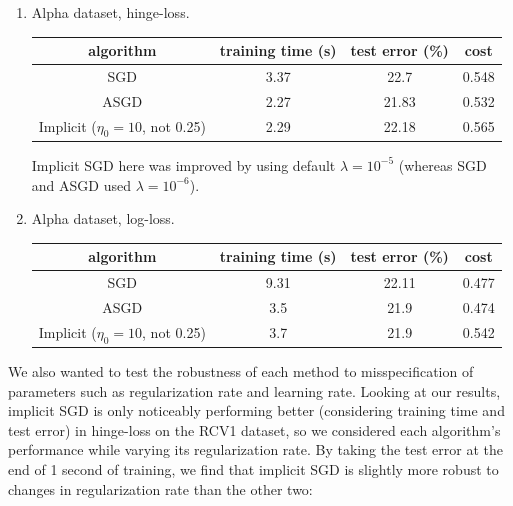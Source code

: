 \documentclass{article}
\begin{document}
\begin{enumerate}[(a)]
\begin{enumerate}[1.]
\item Alpha dataset, hinge-loss.
\begin{center}
\begin{tabular}{ c | c | c | c }
  algorithm & training time (s) & test error (\%) & cost \\ \hline                       
  SGD & 3.37 & 22.7 & 0.548\\
  ASGD & 2.27 & 21.83 & 0.532\\
  Implicit ($\eta_0=10$, not 0.25) & 2.29 & 22.18 & 0.565\\
\end{tabular}
\end{center}
Implicit SGD here was improved by using default $\lambda = 10^{-5}$ (whereas SGD and ASGD used $\lambda = 10^{-6}$).

\item Alpha dataset, log-loss.
\begin{center}
\begin{tabular}{ c | c | c | c }
  algorithm & training time (s) & test error (\%) & cost \\ \hline                       
  SGD & 9.31 &  22.11 & 0.477\\
  ASGD & 3.5 & 21.9 & 0.474\\
  Implicit ($\eta_0=10$, not 0.25) & 3.7 & 21.9 & 0.542\\
\end{tabular}
\end{center}
\end{enumerate}
\end{enumerate}

We also wanted to test the robustness of each method to misspecification of parameters such as regularization rate and learning rate. Looking at our results, implicit SGD is only noticeably performing better (considering training time and test error) in hinge-loss on the RCV1 dataset, so we considered each algorithm's performance while varying its regularization rate. By taking the test error at the end of 1 second of training, we find that implicit SGD is slightly more robust to changes in regularization rate than the other two:
\end{document}
